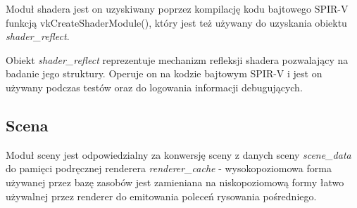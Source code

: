 Moduł shadera jest on uzyskiwany poprzez kompilację kodu bajtowego SPIR-V funkcją vkCreateShaderModule(), który jest też używany do uzyskania obiektu \textit{shader\_reflect}.

Obiekt \textit{shader\_reflect} reprezentuje mechanizm refleksji shadera pozwalający na badanie jego struktury.
Operuje on na kodzie bajtowym SPIR-V i jest on używany podczas testów oraz do logowania informacji debugujących.


\subsection{Scena}

Moduł sceny jest odpowiedzialny za konwersję sceny z danych sceny \textit{scene\_data} do pamięci podręcznej renderera \textit{renderer\_cache} - wysokopoziomowa forma używanej przez bazę zasobów jest zamieniana na niskopoziomową formy łatwo używalnej przez renderer do emitowania poleceń rysowania pośredniego.

